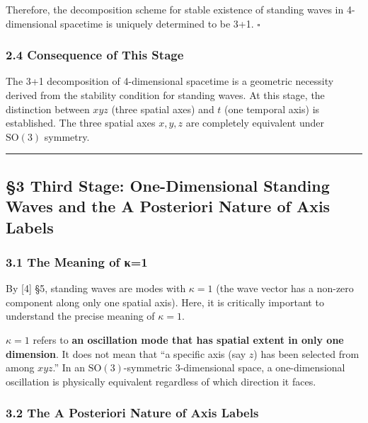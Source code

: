 \documentclass[
  a4paper,11pt]{article}
\begin{document}
Therefore, the decomposition scheme for stable existence of standing
waves in 4-dimensional spacetime is uniquely determined to be 3+1.
\(\square\)

\subsubsection{2.4 Consequence of This
Stage}\label{consequence-of-this-stage-1}

The 3+1 decomposition of 4-dimensional spacetime is a geometric
necessity derived from the stability condition for standing waves. At
this stage, the distinction between \(xyz\) (three spatial axes) and
\(t\) (one temporal axis) is established. The three spatial axes
\(x, y, z\) are completely equivalent under \(\mathrm{SO}(3)\) symmetry.

\begin{center}\rule{0.5\linewidth}{0.5pt}\end{center}

\subsection{§3 Third Stage: One-Dimensional Standing Waves and the A
Posteriori Nature of Axis
Labels}\label{third-stage-one-dimensional-standing-waves-and-the-a-posteriori-nature-of-axis-labels}

\subsubsection{3.1 The Meaning of κ=1}\label{the-meaning-of-ux3ba1}

By {[}4{]} §5, standing waves are modes with \(\kappa = 1\) (the wave
vector has a non-zero component along only one spatial axis). Here, it
is critically important to understand the precise meaning of
\(\kappa = 1\).

\(\kappa = 1\) refers to \textbf{an oscillation mode that has spatial
extent in only one dimension}. It does not mean that ``a specific axis
(say \(z\)) has been selected from among \(xyz\).'' In an
\(\mathrm{SO}(3)\)-symmetric 3-dimensional space, a one-dimensional
oscillation is physically equivalent regardless of which direction it
faces.

\subsubsection{3.2 The A Posteriori Nature of Axis
Labels}\label{the-a-posteriori-nature-of-axis-labels}
\end{document}
